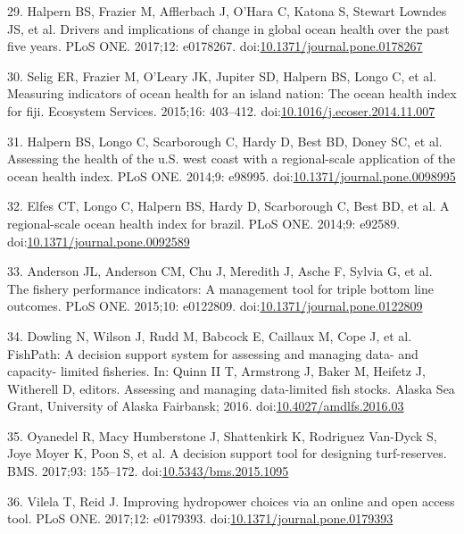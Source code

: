 \documentclass[12pt,]{article}
\begin{document}
\hypertarget{ref-halpern_2017-Zi}{}
29. Halpern BS, Frazier M, Afflerbach J, O'Hara C, Katona S, Stewart
Lowndes JS, et al. Drivers and implications of change in global ocean
health over the past five years. PLoS ONE. 2017;12: e0178267.
doi:\href{https://doi.org/10.1371/journal.pone.0178267}{10.1371/journal.pone.0178267}

\hypertarget{ref-selig_2015-F9}{}
30. Selig ER, Frazier M, O'Leary JK, Jupiter SD, Halpern BS, Longo C, et
al. Measuring indicators of ocean health for an island nation: The ocean
health index for fiji. Ecosystem Services. 2015;16: 403--412.
doi:\href{https://doi.org/10.1016/j.ecoser.2014.11.007}{10.1016/j.ecoser.2014.11.007}

\hypertarget{ref-halpern_2014-lQ}{}
31. Halpern BS, Longo C, Scarborough C, Hardy D, Best BD, Doney SC, et
al. Assessing the health of the u.S. west coast with a regional-scale
application of the ocean health index. PLoS ONE. 2014;9: e98995.
doi:\href{https://doi.org/10.1371/journal.pone.0098995}{10.1371/journal.pone.0098995}

\hypertarget{ref-elfes_2014-RC}{}
32. Elfes CT, Longo C, Halpern BS, Hardy D, Scarborough C, Best BD, et
al. A regional-scale ocean health index for brazil. PLoS ONE. 2014;9:
e92589.
doi:\href{https://doi.org/10.1371/journal.pone.0092589}{10.1371/journal.pone.0092589}

\hypertarget{ref-anderson_2015-ND}{}
33. Anderson JL, Anderson CM, Chu J, Meredith J, Asche F, Sylvia G, et
al. The fishery performance indicators: A management tool for triple
bottom line outcomes. PLoS ONE. 2015;10: e0122809.
doi:\href{https://doi.org/10.1371/journal.pone.0122809}{10.1371/journal.pone.0122809}

\hypertarget{ref-dowling_2016-pO}{}
34. Dowling N, Wilson J, Rudd M, Babcock E, Caillaux M, Cope J, et al.
FishPath: A decision support system for assessing and managing data- and
capacity- limited fisheries. In: Quinn II T, Armstrong J, Baker M,
Heifetz J, Witherell D, editors. Assessing and managing data-limited
fish stocks. Alaska Sea Grant, University of Alaska Fairbansk; 2016.
doi:\href{https://doi.org/10.4027/amdlfs.2016.03}{10.4027/amdlfs.2016.03}

\hypertarget{ref-oyanedel_2017-TO}{}
35. Oyanedel R, Macy Humberstone J, Shattenkirk K, Rodriguez Van-Dyck S,
Joye Moyer K, Poon S, et al. A decision support tool for designing
turf-reserves. BMS. 2017;93: 155--172.
doi:\href{https://doi.org/10.5343/bms.2015.1095}{10.5343/bms.2015.1095}

\hypertarget{ref-vilela_2017-Zo}{}
36. Vilela T, Reid J. Improving hydropower choices via an online and
open access tool. PLoS ONE. 2017;12: e0179393.
doi:\href{https://doi.org/10.1371/journal.pone.0179393}{10.1371/journal.pone.0179393}
\end{document}
